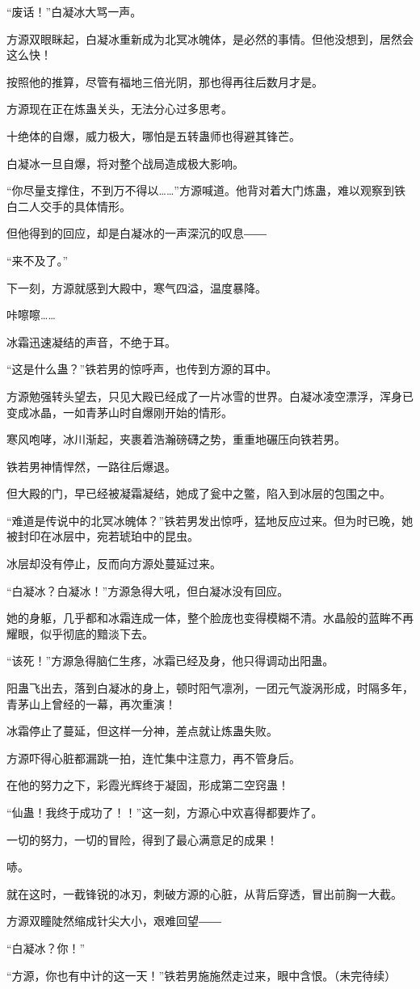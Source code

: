 \begin{this_body}
“废话！”白凝冰大骂一声。

方源双眼眯起，白凝冰重新成为北冥冰魄体，是必然的事情。但他没想到，居然会这么快！

按照他的推算，尽管有福地三倍光阴，那也得再往后数月才是。

方源现在正在炼蛊关头，无法分心过多思考。

十绝体的自爆，威力极大，哪怕是五转蛊师也得避其锋芒。

白凝冰一旦自爆，将对整个战局造成极大影响。

“你尽量支撑住，不到万不得以……”方源喊道。他背对着大门炼蛊，难以观察到铁白二人交手的具体情形。

但他得到的回应，却是白凝冰的一声深沉的叹息――

“来不及了。”

下一刻，方源就感到大殿中，寒气四溢，温度暴降。

咔嚓嚓……

冰霜迅速凝结的声音，不绝于耳。

“这是什么蛊？”铁若男的惊呼声，也传到方源的耳中。

方源勉强转头望去，只见大殿已经成了一片冰雪的世界。白凝冰凌空漂浮，浑身已变成冰晶，一如青茅山时自爆刚开始的情形。

寒风咆哮，冰川渐起，夹裹着浩瀚磅礴之势，重重地碾压向铁若男。

铁若男神情悍然，一路往后爆退。

但大殿的门，早已经被凝霜凝结，她成了瓮中之鳖，陷入到冰层的包围之中。

“难道是传说中的北冥冰魄体？”铁若男发出惊呼，猛地反应过来。但为时已晚，她被封印在冰层中，宛若琥珀中的昆虫。

冰层却没有停止，反而向方源处蔓延过来。

“白凝冰？白凝冰！”方源急得大吼，但白凝冰没有回应。

她的身躯，几乎都和冰霜连成一体，整个脸庞也变得模糊不清。水晶般的蓝眸不再耀眼，似乎彻底的黯淡下去。

“该死！”方源急得脑仁生疼，冰霜已经及身，他只得调动出阳蛊。

阳蛊飞出去，落到白凝冰的身上，顿时阳气凛冽，一团元气漩涡形成，时隔多年，青茅山上曾经的一幕，再次重演！

冰霜停止了蔓延，但这样一分神，差点就让炼蛊失败。

方源吓得心脏都漏跳一拍，连忙集中注意力，再不管身后。

在他的努力之下，彩霞光辉终于凝固，形成第二空窍蛊！

“仙蛊！我终于成功了！！”这一刻，方源心中欢喜得都要炸了。

一切的努力，一切的冒险，得到了最心满意足的成果！

哧。

就在这时，一截锋锐的冰刃，刺破方源的心脏，从背后穿透，冒出前胸一大截。

方源双瞳陡然缩成针尖大小，艰难回望――

“白凝冰？你！”

“方源，你也有中计的这一天！”铁若男施施然走过来，眼中含恨。（未完待续）

\end{this_body}

